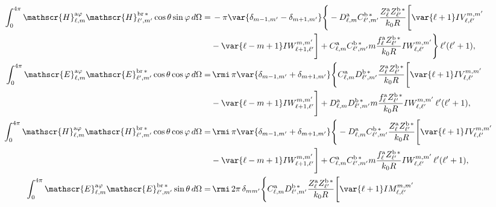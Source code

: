 \begin{align} 
\int_0^{4\pi}\mathscr{H}_{\ell, m}^{\text{a}\varphi}\mathscr{H}_{\ell^{\prime}, m^{\prime}}^{\text{br}\,*}\cos\theta\sin\varphi \, d\Omega
%
 =& \, - \pi \var{ \delta_{m-1, m^{\prime}} - \delta_{m+1, m^{\prime}} } \Bigg\{ -D_{\ell, m}^{\rm a} C_{\ell^{\prime}, m^{\prime}}^{\rm b \, *} \frac{Z_{\ell}^{\rm a} Z_{\ell^{\prime}}^{\rm b \, *}}{k_0 R} \Bigg[\var{\ell +1} IV_{\ell, \ell^{\prime}}^{m, m^{\prime}} \nonumber \\ 
% 
&-\var{\ell - m +1} IW_{\ell + 1, \ell^{\prime}}^{m, m^{\prime}} \Bigg]
%
 + C_{\ell, m}^{\rm a} C_{\ell^{\prime}, m^{\prime}}^{\rm b \, *} m \frac{f_{\ell}^{\rm a} Z_{\ell^{\prime}}^{\rm b\, *}}{k_0 R} IW_{\ell, \ell^{\prime}}^{m, m^{\prime}} \Bigg\} \, \ell^{\prime}(\ell^{\prime}+1),  \\
% 
%
%
%
\int_0^{4\pi}\mathscr{E}_{\ell, m}^{\text{a}\varphi}\mathscr{E}_{\ell^{\prime}, m^{\prime}}^{\text{br}\,*}\cos\theta\cos\varphi \, d\Omega
%
 =& \, \rmi \, \pi \var{ \delta_{m-1, m^{\prime}} + \delta_{m+1, m^{\prime}} } \Bigg\{ C_{\ell, m}^{\rm a} D_{\ell^{\prime}, m^{\prime}}^{\rm b \, *} \frac{Z_{\ell}^{\rm a} Z_{\ell^{\prime}}^{\rm b \, *}}{k_0 R} \Bigg[\var{\ell +1} IV_{\ell, \ell^{\prime}}^{m, m^{\prime}} \nonumber \\ 
% 
&-\var{\ell - m +1} IW_{\ell + 1, \ell^{\prime}}^{m, m^{\prime}} \Bigg]
%
 + D_{\ell, m}^{\rm a} D_{\ell^{\prime}, m^{\prime}}^{\rm b \, *} m \frac{f_{\ell}^{\rm a} Z_{\ell^{\prime}}^{\rm b\, *}}{k_0 R} IW_{\ell, \ell^{\prime}}^{m, m^{\prime}} \, \ell^{\prime}(\ell^{\prime}+1),\\
%
%
\int_0^{4\pi}\mathscr{H}_{\ell, m}^{\text{a}\varphi}\mathscr{H}_{\ell^{\prime}, m^{\prime}}^{\text{br}\,*}\cos\theta\cos\varphi \, d\Omega
%
 =& \, \rmi \, \pi \var{ \delta_{m-1, m^{\prime}} + \delta_{m+1, m^{\prime}} } \Bigg\{ -D_{\ell, m}^{\rm a} C_{\ell^{\prime}, m^{\prime}}^{\rm b \, *} \frac{Z_{\ell}^{\rm a} Z_{\ell^{\prime}}^{\rm b \, *}}{k_0 R} \Bigg[\var{\ell +1} IV_{\ell, \ell^{\prime}}^{m, m^{\prime}} \nonumber \\ 
% 
&-\var{\ell - m +1} IW_{\ell + 1, \ell^{\prime}}^{m, m^{\prime}} \Bigg]
%
 + C_{\ell, m}^{\rm a} C_{\ell^{\prime}, m^{\prime}}^{\rm b \, *} m \frac{f_{\ell}^{\rm a} Z_{\ell^{\prime}}^{\rm b\, *}}{k_0 R} IW_{\ell, \ell^{\prime}}^{m, m^{\prime}} \, \ell^{\prime}(\ell^{\prime}+1),\\
% 
%
%
%
\int_0^{4\pi}\mathscr{E}_{\ell, m}^{\text{a}\varphi}\mathscr{E}_{\ell^{\prime}, m^{\prime}}^{\text{br}\,*}\sin\theta \, d\Omega
%
 =& \, \rmi \, 2\pi \, \delta_{m m^{\prime}} \Bigg\{ C_{\ell, m}^{\rm a} D_{\ell^{\prime}, m^{\prime}}^{\rm b \, *} \frac{Z_{\ell}^{\rm a} Z_{\ell^{\prime}}^{\rm b \, *}}{k_0 R} \Bigg[\var{\ell +1} IM_{\ell, \ell^{\prime}}^{m, m^{\prime}} \nonumber \\ 

\end{align}
